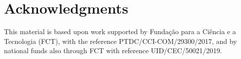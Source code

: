 \documentclass{article}
\begin{document}

\section*{Acknowledgments}

This material is based upon work supported by Fundação para a Ciência 
e a Tecnologia (FCT), with the reference PTDC/CCI-COM/29300/2017, and by national funds also through FCT with reference UID/CEC/50021/2019.

{
  \small
  \balance
  
  
}
\end{document}
